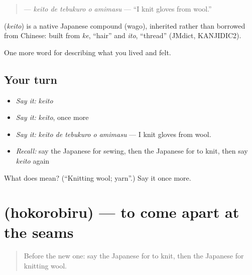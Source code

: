 \begin{quote}
\textbf{  } — \emph{keito de tebukuro o amimasu} — \textquotedblleft{}I knit gloves from wool.\textquotedblright{}
\end{quote}

\begin{cousinweb}
\textbf{} (\emph{keito}) is a native Japanese compound (wago), inherited rather than borrowed from Chinese: built from \emph{ke}, \textquotedblleft{}hair\textquotedblright{} and \emph{ito}, \textquotedblleft{}thread\textquotedblright{} (JMdict, KANJIDIC2).
\end{cousinweb}

\begin{grammarlens}[title={What you've built}]
One more word for describing what you lived and felt.
\end{grammarlens}

\subsection*{Your turn}
\begin{itemize}
\raggedright
  \item \emph{Say it:} \emph{keito}
  \item \emph{Say it:} \emph{keito}, once more
  \item \emph{Say it:} \emph{keito de tebukuro o amimasu} — I knit gloves from wool.
  \item \emph{Recall:} say the Japanese for sewing, then the Japanese for to knit, then say \emph{keito} again
\end{itemize}

\begin{tcolorbox}[breakable,colback=teal!4,colframe=teal!35!black,title={Before you move on}]
What does  mean? (\textquotedblleft{}Knitting wool; yarn\textquotedblright{}.) Say it once more.
\end{tcolorbox}
\section[\texorpdfstring{\ja{ほころびる} (hokorobiru)}{ほころびる (hokorobiru)}]{ (hokorobiru) — to come apart at the seams}

\label{lesson:JA-C484-hokorobiru}



\begin{quote}
Before the new one: say the Japanese for to knit, then the Japanese for knitting wool.
\end{quote}

